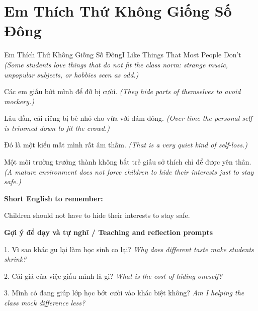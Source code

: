 \section{Em Thích Thứ Không Giống Số Đông}
\begin{truyen}{Em Thích Thứ Không Giống Số Đông}{I Like Things That Most People Don't}
\textit{(Some students love things that do not fit the class norm: strange music, unpopular subjects, or hobbies seen as odd.)}

Các em giấu bớt mình để đỡ bị cười.
\textit{(They hide parts of themselves to avoid mockery.)}

Lâu dần, cái riêng bị bẻ nhỏ cho vừa với đám đông.
\textit{(Over time the personal self is trimmed down to fit the crowd.)}

Đó là một kiểu mất mình rất âm thầm.
\textit{(That is a very quiet kind of self-loss.)}

\end{truyen}

\begin{baihoc}
Một môi trường trưởng thành không bắt trẻ giấu sở thích chỉ để được yên thân.
\textit{(A mature environment does not force children to hide their interests just to stay safe.)}
\end{baihoc}

\begin{ghinhoanh}
\textbf{Short English to remember:}

Children should not have to hide their interests to stay safe.

\end{ghinhoanh}

\begin{tuhocnhanh}
\textbf{Gợi ý để dạy và tự nghĩ / Teaching and reflection prompts}

1. Vì sao khác gu lại làm học sinh co lại? \textit{Why does different taste make students shrink?}

2. Cái giá của việc giấu mình là gì? \textit{What is the cost of hiding oneself?}

3. Mình có đang giúp lớp học bớt cười vào khác biệt không? \textit{Am I helping the class mock difference less?}
\end{tuhocnhanh}
\ngancach

